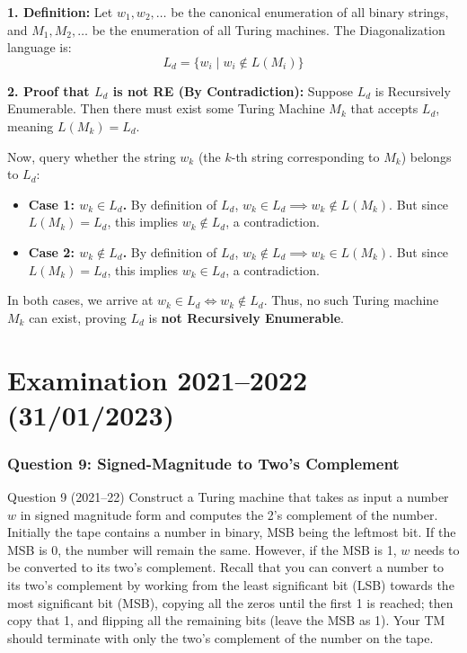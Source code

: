 \documentclass[11pt,a4paper]{article}
\begin{document}
\begin{solutionbox}
\textbf{1. Definition:}
Let $w_1, w_2, \dots$ be the canonical enumeration of all binary strings, and $M_1, M_2, \dots$ be the enumeration of all Turing machines. The Diagonalization language is:
$$L_d = \{w_i \mid w_i \notin L(M_i)\}$$

\textbf{2. Proof that $L_d$ is not RE (By Contradiction):}
Suppose $L_d$ is Recursively Enumerable. Then there must exist some Turing Machine $M_k$ that accepts $L_d$, meaning $L(M_k) = L_d$.

Now, query whether the string $w_k$ (the $k$-th string corresponding to $M_k$) belongs to $L_d$:
\begin{itemize}[leftmargin=*]
    \item \textbf{Case 1: $w_k \in L_d$.}
    By definition of $L_d$, $w_k \in L_d \implies w_k \notin L(M_k)$. But since $L(M_k) = L_d$, this implies $w_k \notin L_d$, a contradiction.
    \item \textbf{Case 2: $w_k \notin L_d$.}
    By definition of $L_d$, $w_k \notin L_d \implies w_k \in L(M_k)$. But since $L(M_k) = L_d$, this implies $w_k \in L_d$, a contradiction.
\end{itemize}
In both cases, we arrive at $w_k \in L_d \iff w_k \notin L_d$. Thus, no such Turing machine $M_k$ can exist, proving $L_d$ is \textbf{not Recursively Enumerable}.
\end{solutionbox}

\part{Examination 2021--2022 (31/01/2023)}

\section{Question 9: Signed-Magnitude to Two's Complement}
\begin{questionbox}{Question 9 (2021--22)}
Construct a Turing machine that takes as input a number $w$ in signed magnitude form and computes the 2's complement of the number. Initially the tape contains a number in binary, MSB being the leftmost bit. If the MSB is 0, the number will remain the same. However, if the MSB is 1, $w$ needs to be converted to its two's complement. Recall that you can convert a number to its two's complement by working from the least significant bit (LSB) towards the most significant bit (MSB), copying all the zeros until the first 1 is reached; then copy that 1, and flipping all the remaining bits (leave the MSB as 1). Your TM should terminate with only the two's complement of the number on the tape.
\end{questionbox}
\end{document}
